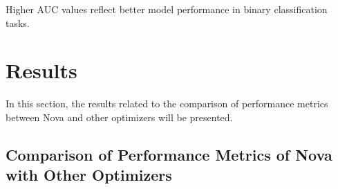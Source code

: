 \documentclass[10pt,twocolumn]{article}
\begin{document}
Higher AUC values reflect better model performance in binary classification tasks.



%
%
%
%
%
%
%
%
%



\section{Results}\label{Sec 5}



In this section, the results related to the comparison of performance metrics between Nova and other optimizers will be presented. 




\subsection{Comparison of Performance Metrics of Nova with Other Optimizers} 
\end{document}
